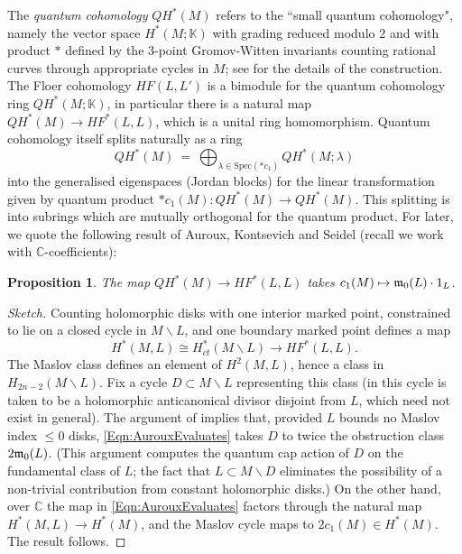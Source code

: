 \documentclass[reqno,10pt]{amsart}
\numberwithin{equation}{section}
\newcommand{\bC}{{\mathbb C}}
\newcommand{\bK}{{\mathbb K}}
\newtheorem{Proposition}[thm]{Proposition}
\theoremstyle{remark}
\begin{document}
The \emph{quantum cohomology} $QH^*(M)$ refers to the ``small quantum cohomology", namely the vector space $H^*(M;\bK)$ with grading reduced modulo $2$ and with product $\ast$ defined by the 3-point Gromov-Witten invariants counting rational curves through appropriate cycles in $M$; see \cite{McD-S} for the details of the construction.  The Floer cohomology $HF(L,L')$ is a bimodule for the quantum cohomology ring $QH^*(M;\bK)$, in particular there is a natural map $QH^*(M) \rightarrow HF^*(L,L)$, which is  a unital ring homomorphism. 
Quantum cohomology itself splits naturally as a ring
\begin{equation} \label{Eqn:QHsummands}
QH^*(M) \ = \ \bigoplus_{\lambda \in \textrm{Spec}(\ast c_1)} QH^*(M;\lambda)
\end{equation}
into the generalised eigenspaces (Jordan blocks) for the linear transformation given by  quantum product $\ast c_1(M): QH^*(M) \rightarrow QH^*(M)$. This splitting is into subrings which are mutually orthogonal for the quantum product.  For later, we quote the following result of Auroux, Kontsevich and Seidel \cite{Auroux:toric} (recall we work with $\bC$-coefficients):

\begin{Proposition}\label{Lem:quantumcap}
The map $QH^*(M)\rightarrow HF^*(L,L)$ takes $c_1(M) \mapsto \frak{m}_0(L)\cdot 1_L$.
\end{Proposition}

\begin{proof}[Sketch]
 Counting holomorphic disks with one interior marked point, constrained to lie on a closed cycle in $M\backslash L$, and one boundary marked point defines a map
\begin{equation} \label{Eqn:AurouxEvaluates}
H^*(M,L) \cong H^*_{ct}(M \backslash L) \longrightarrow HF^*(L,L).
\end{equation}
The Maslov class defines an element of $H^2(M,L)$, hence a class in $H_{2n-2}(M\backslash L)$. Fix a cycle $D\subset M\backslash L$ representing this class (in \cite{Auroux:toric} this cycle is taken to be a holomorphic anticanonical divisor disjoint from $L$, which need not exist in general). The argument of \cite{Auroux:toric} implies that, provided $L$ bounds no Maslov index $\leq 0$ disks, \eqref{Eqn:AurouxEvaluates} takes $D$ to twice the obstruction class $2\frak{m}_0(L)$.  (This argument computes the quantum cap action of $D$ on the fundamental class of $L$; the fact that $L \subset M\backslash D$ eliminates the possibility of a non-trivial contribution from constant holomorphic disks.)  On the other hand, over $\bC$ the map in  \eqref{Eqn:AurouxEvaluates} factors through the natural map $H^*(M,L) \rightarrow H^*(M)$, and the Maslov cycle maps to $2c_1(M) \in H^*(M)$. The result follows.
\end{proof}
\end{document}
